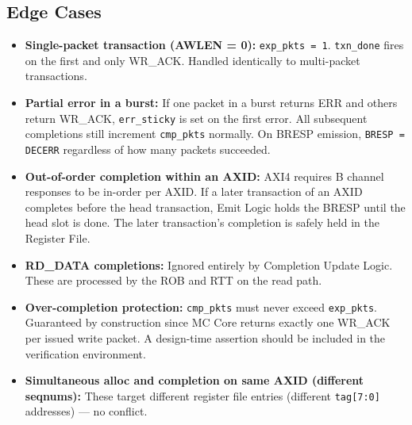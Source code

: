 \subsection{Edge Cases}

\begin{itemize}
  \item \textbf{Single-packet transaction (AWLEN = 0):}
        \texttt{exp\_pkts = 1}. \texttt{txn\_done} fires on the first
        and only WR\_ACK. Handled identically to multi-packet
        transactions.
  \item \textbf{Partial error in a burst:} If one packet in a burst
        returns ERR and others return WR\_ACK, \texttt{err\_sticky} is
        set on the first error. All subsequent completions still
        increment \texttt{cmp\_pkts} normally. On BRESP emission,
        \texttt{BRESP = DECERR} regardless of how many packets
        succeeded.
  \item \textbf{Out-of-order completion within an AXID:} AXI4 requires
        B channel responses to be in-order per AXID. If a later
        transaction of an AXID completes before the head transaction,
        Emit Logic holds the BRESP until the head slot is done. The
        later transaction's completion is safely held in the Register
        File.
  \item \textbf{RD\_DATA completions:} Ignored entirely by Completion
        Update Logic. These are processed by the ROB and RTT on the
        read path.
  \item \textbf{Over-completion protection:} \texttt{cmp\_pkts} must
        never exceed \texttt{exp\_pkts}. Guaranteed by construction
        since MC Core returns exactly one WR\_ACK per issued write
        packet. A design-time assertion should be included in the
        verification environment.
  \item \textbf{Simultaneous alloc and completion on same AXID
        (different seqnums):} These target different register file
        entries (different \texttt{tag[7:0]} addresses) — no conflict.
\end{itemize}